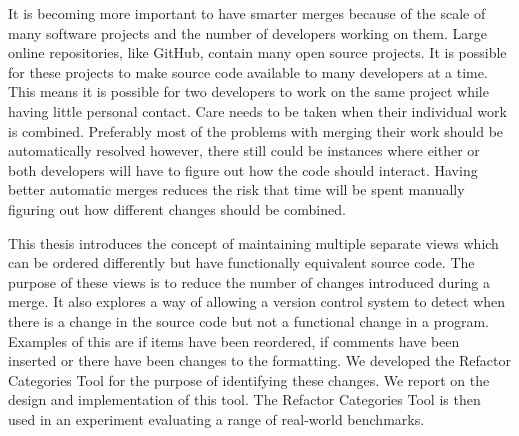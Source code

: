 It is becoming more important to have smarter merges because of the scale of many software projects and the number of developers working on them.
Large online repositories, like GitHub, contain many open source projects.
It is possible for these projects to make source code available to many developers at a time.
This means it is possible for two developers to work on the same project while having little personal contact.
Care needs to be taken when their individual work is combined.
Preferably most of the problems with merging their work should be automatically resolved however,
there still could be instances where either or both developers will have to figure out how the code should interact.
Having better automatic merges reduces the risk that time will be spent manually figuring out how different changes should be combined.

This thesis introduces the concept of maintaining multiple separate views which can be ordered differently but have functionally equivalent source code.
The purpose of these views is to reduce the number of changes introduced during a merge. 
It also explores a way of allowing a version control system to detect when there is a change in the source code but not a functional change in a program.
Examples of this are if items have been reordered, if comments have been inserted or there have been changes to the formatting. 
We developed the Refactor Categories Tool for the purpose of identifying these changes. 
We report on the design and implementation of this tool.
The Refactor Categories Tool is then used in an experiment evaluating a range of real-world benchmarks.


% 
 
